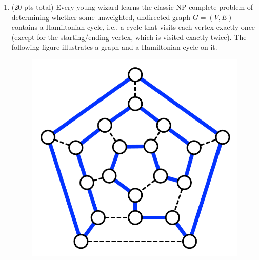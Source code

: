 \documentclass[12pt]{article}
\theoremstyle{remark}
\begin{document}
\begin{enumerate}
\begin{enumerate}
	


	\end{enumerate}
	
	
	\item (20 pts total) Every young wizard learns the classic NP-complete problem of determining whether some unweighted, undirected graph $G=(V,E)$ contains a Hamiltonian cycle, i.e., a cycle that visits each vertex exactly once (except for the starting/ending vertex, which is visited exactly twice). The following figure illustrates a graph and a Hamiltonian cycle on it.

\begin{figure}[h!]
\begin{center}
\includegraphics[scale=0.7]{hamiltonian.pdf} 
\end{center}
\vspace{-4mm}
\end{figure}



\end{enumerate}
\end{document}
